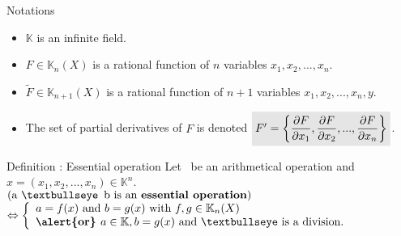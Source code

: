 \begin{frame}{Notations}

    \small
    \begin{itemize}
        \item $\mathbb{K}$ is an infinite field.\\
            \vskip 0.1cm
        \item$F \in \mathbb{K}_n(X)$ is a rational function of $n$ variables $x_1,x_2,...,x_n$.\\
        \item$\widetilde{F} \in \mathbb{K}_{n+1}(X)$ is a rational function of $n+1$ variables $x_1,x_2,...,x_n,y$.
            \vskip 0.3cm
        \item The set of partial derivatives of $F$ is denoted
            $\colbox{F' = \left \{ \pd{F}{x_1},\pd{F}{x_2}, ... ,\pd{F}{x_n} \right \}}$.
    \end{itemize}

    \vskip 0.3cm

    \begin{block}{Definition : Essential operation}
        Let \textbullseye\, be an arithmetical operation and $x = (x_1,x_2,...,x_n) \in \mathbb{K}^n$.\\
        \vskip 0.5cm
        $
        \left(\textrm{a \textbullseye\, b is an \textbf{essential operation}}\right)
        $
        \vskip 0.3cm
        $
        \Leftrightarrow
        \left\{
            \begin{array}{l}
                a = f(x)\textrm{ and }b = g(x) \textrm{ with } f,g \in \mathbb{K}_n(X) \\
                \textrm{\textbf{\alert{or} }}a \in \mathbb{K}, b = g(x) \textrm{ and \textbullseye\ is a division.} \\
            \end{array}
        \right.
        $
    \end{block}

\end{frame}



